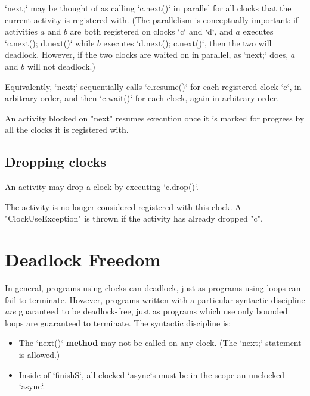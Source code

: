 \xcd`next;` may be thought of as calling \xcd`c.next()` in parallel for all
clocks that the current activity is registered with.  (The parallelism is
conceptually important: if activities {$a$} and {$b$} are both
registered on clocks \xcd`c` and \xcd`d`, and {$a$} executes
\xcd`c.next(); d.next()` while {$b$} executes \xcd`d.next(); c.next()`,
then the two will deadlock.  However, if the two clocks are waited on in
parallel, as \xcd`next;` does, {$a$} and {$b$} will not deadlock.)

Equivalently, \xcd`next;` sequentially calls \xcd`c.resume()` for each
registered clock \xcd`c`, in arbitrary order, and then \xcd`c.wait()` for each
clock, again in arbitrary order.  



An activity blocked on \xcd"next" resumes execution once
it is marked for progress by all the clocks it is registered with.

\subsection{Dropping clocks}\label{sec:clock:drop}
An activity may drop a clock by executing \xcd`c.drop()`.



\noindent{} The activity is no longer considered registered with this
clock.  A \xcd"ClockUseException" is thrown if the activity has
already dropped \xcd"c".

\section{Deadlock Freedom}

In general, programs using clocks can deadlock, just as programs using loops
can fail to terminate.  However, programs written with a particular syntactic
discipline {\em are} guaranteed to be deadlock-free, just as programs which
use only bounded loops are guaranteed to terminate.  The syntactic discipline
is: 
\begin{itemize}
\item The \xcd`next()` {\bf method} may not be called on any clock. (The
      \xcd`next;` statement is allowed.)
\item Inside of \xcd`finish{S}`, all clocked \xcd`async`s must be in the scope
      an unclocked \xcd`async`.  
\end{itemize}


